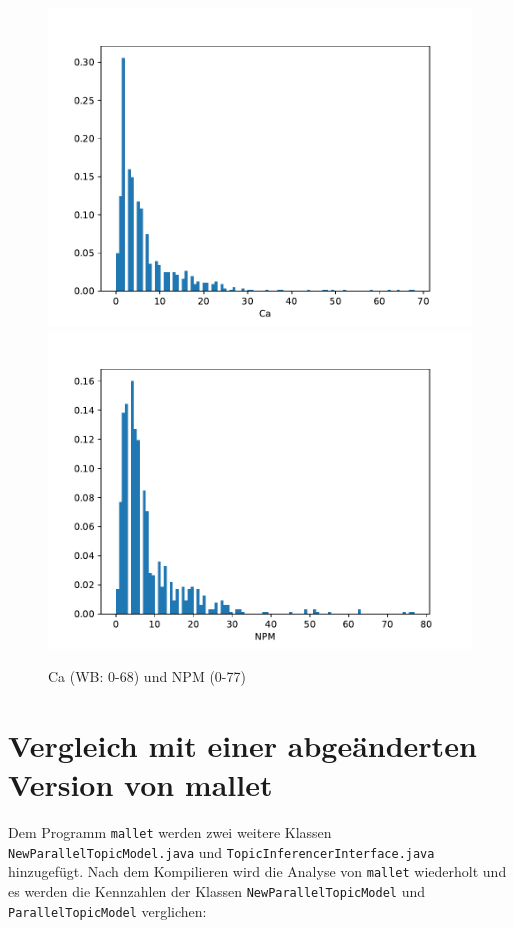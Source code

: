 \documentclass{scrreprt}
\newcommand{\lstx}[1]{\lstinline$#1$}
\begin{document}

\begin{figure}
 \includegraphics[width=.45\textwidth]{./Ca.pdf}
  \includegraphics[width=.45\textwidth]{./NPM.pdf}
 \caption{Ca (WB: 0-68) und NPM (0-77)}
 \label{abb:ca_npm}
\end{figure}


\section{Vergleich mit einer abgeänderten Version von mallet}

Dem Programm \lstx{mallet} werden zwei weitere Klassen \lstx{NewParallelTopicModel.java} und \lstx{TopicInferencerInterface.java} hinzugefügt. Nach dem Kompilieren wird die Analyse von \lstx{mallet} wiederholt und es werden die Kennzahlen der Klassen \lstx{NewParallelTopicModel} und \lstx{ParallelTopicModel} verglichen:

\end{document}
